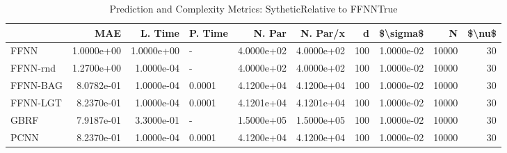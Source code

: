 \begin{table}
\centering
\caption{Prediction and Complexity Metrics: SytheticRelative to FFNNTrue}
\label{tab__Sythetic__Fix_Neurons_QTrue}
\begin{tabular}{lrrlrrrrrr}
\toprule
{} &        MAE &    L. Time & P. Time &     N. Par &   N. Par/x &    d &   \$\textbackslash sigma\$ &      N &  \$\textbackslash nu\$ \\
\midrule
FFNN     & 1.0000e+00 & 1.0000e+00 &       - & 4.0000e+02 & 4.0000e+02 &  100 & 1.0000e-02 &  10000 &     30 \\
FFNN-rnd & 1.2700e+00 & 1.0000e-04 &       - & 4.0000e+02 & 4.0000e+02 &  100 & 1.0000e-02 &  10000 &     30 \\
FFNN-BAG & 8.0782e-01 & 1.0000e-04 &  0.0001 & 4.1200e+04 & 4.1200e+04 &  100 & 1.0000e-02 &  10000 &     30 \\
FFNN-LGT & 8.2370e-01 & 1.0000e-04 &  0.0001 & 4.1201e+04 & 4.1201e+04 &  100 & 1.0000e-02 &  10000 &     30 \\
GBRF     & 7.9187e-01 & 3.3000e-01 &       - & 1.5000e+05 & 1.5000e+05 &  100 & 1.0000e-02 &  10000 &     30 \\
PCNN     & 8.2370e-01 & 1.0000e-04 &  0.0001 & 4.1200e+04 & 4.1200e+04 &  100 & 1.0000e-02 &  10000 &     30 \\
\bottomrule
\end{tabular}
\end{table}
